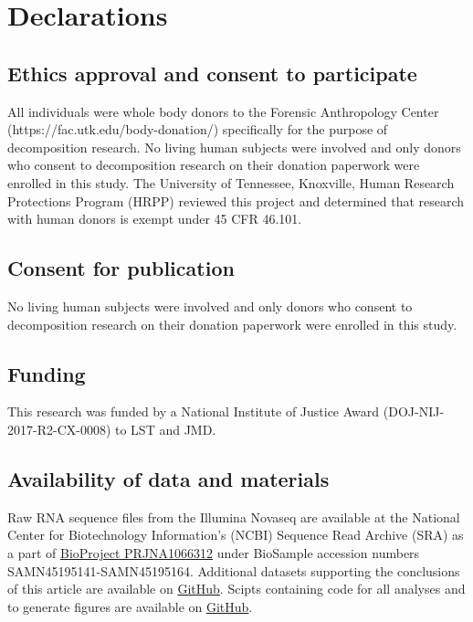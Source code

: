 \documentclass[
  sn-nature,
  lineno, referee]{sn-jnl}
\begin{document}
\section{Declarations}\label{declarations}

\subsection{Ethics approval and consent to
participate}\label{ethics-approval-and-consent-to-participate}

All individuals were whole body donors to the Forensic Anthropology
Center (https://fac.utk.edu/body-donation/) specifically for the purpose
of decomposition research. No living human subjects were involved and
only donors who consent to decomposition research on their donation
paperwork were enrolled in this study. The University of Tennessee,
Knoxville, Human Research Protections Program (HRPP) reviewed this
project and determined that research with human donors is exempt under
45 CFR 46.101.

\subsection{Consent for publication}\label{consent-for-publication}

No living human subjects were involved and only donors who consent to
decomposition research on their donation paperwork were enrolled in this
study.

\subsection{Funding}\label{funding}

This research was funded by a National Institute of Justice Award
(DOJ-NIJ-2017-R2-CX-0008) to LST and JMD.

\subsection{Availability of data and
materials}\label{availability-of-data-and-materials}

Raw RNA sequence files from the Illumina Novaseq are available at the
National Center for Biotechnology Information's (NCBI) Sequence Read
Archive (SRA) as a part of
\href{https://www.ncbi.nlm.nih.gov/bioproject/PRJNA1066312/}{BioProject
PRJNA1066312} under BioSample accession numbers
SAMN45195141-SAMN45195164. Additional datasets supporting the
conclusions of this article are available on
\href{https://github.com/amason30/Mason_MetaT_BMC_2024}{GitHub}. Scipts
containing code for all analyses and to generate figures are available
on \href{https://github.com/amason30/Mason_MetaT_BMC_2024}{GitHub}.
\end{document}

